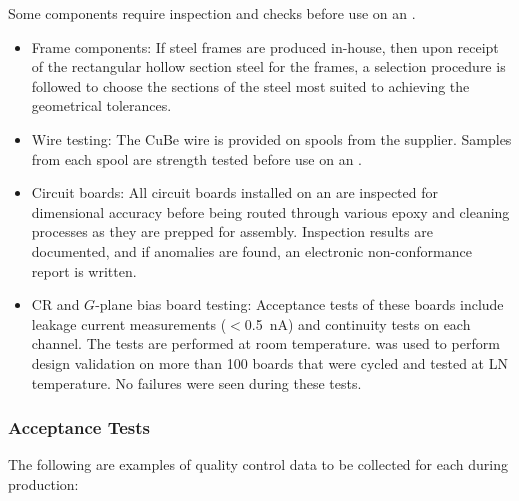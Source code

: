 Some components require inspection and  checks before use on an . 

\begin{itemize}
\item Frame components: If  steel frames are produced in-house, then upon receipt of the rectangular hollow section steel for the frames, a selection procedure is followed to choose the sections of the steel most suited to achieving the geometrical tolerances. 
\item Wire testing: The CuBe wire is provided on spools from the supplier. Samples from each spool are strength tested before use on an .
\item Circuit boards: All circuit boards installed on an  are inspected for dimensional accuracy before being routed through various epoxy and cleaning processes as they are prepped for assembly. Inspection results are documented, and if anomalies are found, an electronic non-conformance report is written.  %
\item CR and $G$-plane bias board testing: Acceptance tests of these boards include leakage current measurements ($<$\SI{0.5}{nA}) and continuity tests on each channel.  The tests are performed at room temperature.  was used to perform design validation on more than \num{100} boards that were cycled and tested at LN temperature. No failures were seen during these tests. 
\end{itemize}


\subsubsection{ Acceptance Tests} 

The following are examples of quality control data to be collected for each  during production:  

